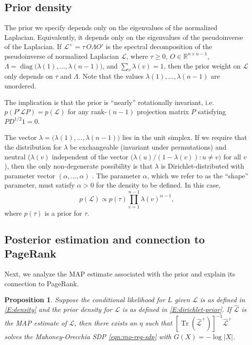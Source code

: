 \documentclass[12pt]{article}
\newcommand{\reals}{\mathbb{R}}
\DeclareMathOperator*{\Tr}{Tr}
\DeclareMathOperator*{\diag}{diag}
\theoremstyle{plain}
\newtheorem{proposition}[theorem]{Proposition}
\begin{document}
\subsection{Prior density}
\label{S:prior-density}

The prior we specify depends only on the eigenvalues of the normalized
Laplacian.  Equivalently, it depends only on the eigenvalues of the pseudoinverse of
the Laplacian.  If $\mathcal{L}^+ = \tau \, O \Lambda O'$ is the spectral
decomposition of the pseudoinverse of normalized Laplacian
$\mathcal{L}$, where $\tau \geq 0$,
$O \in \reals^{n \times n -1}$, 
$\Lambda = \diag\big(\lambda(1), \dotsc, \lambda({n-1})\big)$, and
$\sum_v \lambda(v) = 1$,  then the prior
weight on $\mathcal{L}$ only depends on $\tau$ and $\Lambda$.  Note that the
values $\lambda(1), \dotsc, \lambda(n-1)$ are unordered.

The implication is that the prior is ``nearly'' rotationally
invariant, i.e. $p(P' \mathcal{L} P) = p(\mathcal{L})$ for any rank-$(n-1)$
projection matrix $P$ satisfying $P D^{1/2} 1 = 0$.

The vector $\lambda = \big(\lambda(1), \dotsc, \lambda(n-1)\big)$ lies
in the unit simplex.  If we require that the
distribution for $\lambda$ be exchangeable (invariant under
permutations) and neutral ($\lambda(v)$ independent of the vector
$\big(\lambda(u) / (1 - \lambda(v)) : u \neq v\big)$ for all $v$),
then the only non-degenerate possibility is that $\lambda$ is
Dirichlet-distributed with parameter vector $(\alpha, \ldots, \alpha)$
\cite{fabius1973two}.  The parameter $\alpha$, which we refer to as
the ``shape'' parameter, must satisfy $\alpha > 0$ for the density to
be defined.  In this case,
\begin{equation}\label{E:dirichlet-prior}
  p(\mathcal{L})
   \propto p(\tau) \prod_{v=1}^{n-1} \lambda(v)^{\alpha - 1},
\end{equation}
where $p(\tau)$ is a prior for $\tau$.



\subsection{Posterior estimation and connection to PageRank}
\label{S:posterior-density}

Next, we analyze the MAP estimate associated with the prior and
explain its connection to PageRank.

\begin{proposition}\label{P:map-sdp}
  Suppose the conditional likelihood for $L$ given $\mathcal{L}$ is as
  defined in \eqref{E:density} and the prior density for $\mathcal{L}$
  is as defined in \eqref{E:dirichlet-prior}.  If
  $\mathcal{\hat L}$ is the MAP estimate of $\mathcal{L}$, then
  there exists an $\eta$ such that
  $[\Tr(\mathcal{\hat L}^+)]^{-1} \mathcal{\hat L}^+$ solves the
  Mahoney-Orecchia SDP \eqref{eqn:mo-reg-sdp} with $G(X) = -\log |X|$.
\end{proposition}
\end{document}
